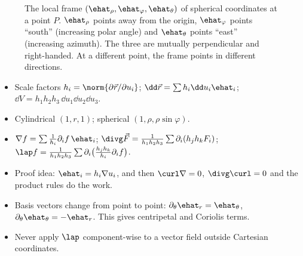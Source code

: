 \begin{figure}[ht]
\centering
{}
\caption{The local frame $(\ehat_\rho,\ehat_\varphi,\ehat_\theta)$ of spherical coordinates at a point $P$. $\ehat_\rho$ points away from the origin, $\ehat_\varphi$ points ``south'' (increasing polar angle) and $\ehat_\theta$ points ``east'' (increasing azimuth). The three are mutually perpendicular and right-handed. At a different point, the frame points in different directions.}
\label{fig:sphericalframe}
\end{figure}

\begin{summarybox}
\begin{itemize}
  \item Scale factors $h_i=\norm{\partial\vec r/\partial u_i}$; $\dd\vec r=\sum h_i\dd u_i\ehat_i$; $\dd V=h_1h_2h_3\,\dd u_1\dd u_2\dd u_3$.
  \item Cylindrical $(1,r,1)$; spherical $(1,\rho,\rho\sin\varphi)$.
  \item $\nabla f=\sum\frac1{h_i}\partial_if\,\ehat_i$; $\divg\vec F=\frac1{h_1h_2h_3}\sum\partial_i(h_jh_kF_i)$; $\lap f=\frac1{h_1h_2h_3}\sum\partial_i\bigl(\frac{h_jh_k}{h_i}\partial_if\bigr)$.
  \item Proof idea: $\ehat_i=h_i\nabla u_i$, and then $\curl\nabla=0$, $\divg\curl=0$ and the product rules do the work.
  \item Basis vectors change from point to point: $\partial_\theta\ehat_r=\ehat_\theta$, $\partial_\theta\ehat_\theta=-\ehat_r$. This gives centripetal and Coriolis terms.
  \item Never apply $\lap$ component-wise to a vector field outside Cartesian coordinates.
\end{itemize}
\end{summarybox}

